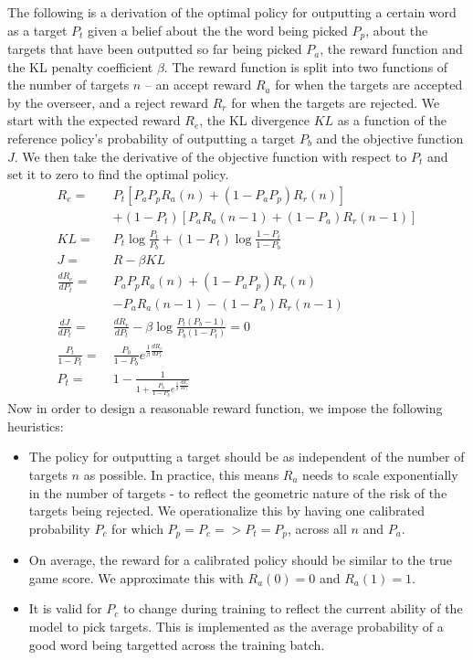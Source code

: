 \documentclass{article}
\begin{document}
The following is a derivation of the optimal policy for outputting a certain word as a target $P_t$ given a belief about the the word being picked $P_p$, about the targets that have been outputted so far being picked $P_a$, the reward function and the KL penalty coefficient $\beta$. The reward function is split into two functions of the number of targets $n$ -- an accept reward $R_a$ for when the targets are accepted by the overseer, and a reject reward $R_r$ for when the targets are rejected. We start with the expected reward $R_e$, the KL divergence $KL$ as a function of the reference policy's probability of outputting a target $P_b$ and the objective function $J$. We then take the derivative of the objective function with respect to $P_t$ and set it to zero to find the optimal policy.
\begin{align*}
  R_e = \:                 & P_t \left[P_aP_pR_a(n)+(1-P_aP_p)R_r(n) \right]                            \\
                           & + (1 - P_t) \left[P_aR_a(n-1)+(1-P_a)R_r(n-1) \right]                      \\
  KL = \:                  & P_t\log \frac{P_t}{P_b} + (1-P_t) \log \frac{1-P_t}{1-P_b}                 \\
  J = \:                   & R - \beta KL                                                               \\
  \frac{dR_e}{dP_t} = \:   & P_aP_pR_a(n) + (1-P_aP_p)R_r(n)                                            \\
                           & - P_aR_a(n-1) - (1-P_a)R_r(n-1)                                            \\
  \frac{dJ}{dP_t} = \:     & \frac{dR_e}{dP_t} - \beta \log \frac{P_t (P_b - 1)}{P_b (1-P_t)} = 0       \\
  \frac{P_t}{1 - P_t} = \: & \frac{P_b}{1 - P_b} e^{\frac{1}{\beta}\frac{dR_e}{dP_t}}                   \\
  P_t = \:                 & 1 - \frac{1}{1 + \frac{P_b}{1 - P_b} e^{\frac{1}{\beta}\frac{dR_e}{dP_t}}}
\end{align*}
Now in order to design a reasonable reward function, we impose the following heuristics:
\begin{itemize}
  \item The policy for outputting a target should be as independent of the number of targets $n$ as possible. In practice, this means $R_a$ needs to scale exponentially in the number of targets - to reflect the geometric nature of the risk of the targets being rejected. We operationalize this by having one calibrated probability $P_c$ for which $P_p = P_c => P_t = P_p$, across all $n$ and $P_a$.
  \item On average, the reward for a calibrated policy should be similar to the true game score. We approximate this with $R_a(0) = 0$ and $R_a(1) = 1$.
  \item It is valid for $P_c$ to change during training to reflect the current ability of the model to pick targets. This is implemented as the average probability of a good word being targetted across the training batch.
\end{itemize}
\end{document}
